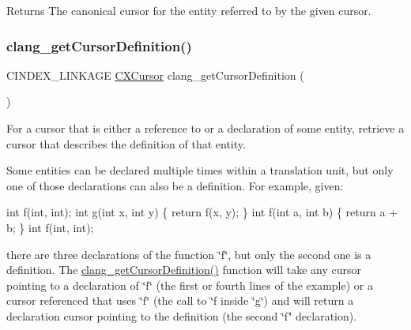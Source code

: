 \begin{DoxyReturn}{Returns}
The canonical cursor for the entity referred to by the given cursor. 
\end{DoxyReturn}
\mbox{\label{group__CINDEX__CURSOR__XREF_gafcfbec461e561bf13f1e8540bbbd655b}} 
\subsubsection{\texorpdfstring{clang\+\_\+get\+Cursor\+Definition()}{clang\_getCursorDefinition()}}
{\footnotesize\ttfamily C\+I\+N\+D\+E\+X\+\_\+\+L\+I\+N\+K\+A\+GE \hyperlink{structCXCursor}{C\+X\+Cursor} clang\+\_\+get\+Cursor\+Definition (\begin{DoxyParamCaption}\item[{\hyperlink{structCXCursor}{C\+X\+Cursor}}]{ }\end{DoxyParamCaption})}



For a cursor that is either a reference to or a declaration of some entity, retrieve a cursor that describes the definition of that entity. 

Some entities can be declared multiple times within a translation unit, but only one of those declarations can also be a definition. For example, given\+:


\begin{DoxyCode}
\textcolor{keywordtype}{int} f(\textcolor{keywordtype}{int}, \textcolor{keywordtype}{int});
\textcolor{keywordtype}{int} g(\textcolor{keywordtype}{int} x, \textcolor{keywordtype}{int} y) \{ \textcolor{keywordflow}{return} f(x, y); \}
\textcolor{keywordtype}{int} f(\textcolor{keywordtype}{int} a, \textcolor{keywordtype}{int} b) \{ \textcolor{keywordflow}{return} a + b; \}
\textcolor{keywordtype}{int} f(\textcolor{keywordtype}{int}, \textcolor{keywordtype}{int});
\end{DoxyCode}


there are three declarations of the function \char`\"{}f\char`\"{}, but only the second one is a definition. The \hyperlink{group__CINDEX__CURSOR__XREF_gafcfbec461e561bf13f1e8540bbbd655b}{clang\+\_\+get\+Cursor\+Definition()} function will take any cursor pointing to a declaration of \char`\"{}f\char`\"{} (the first or fourth lines of the example) or a cursor referenced that uses \char`\"{}f\char`\"{} (the call to \char`\"{}f\textquotesingle{} inside \char`\"{}g\char`\"{}) and will return a
declaration cursor pointing to the definition (the second \char`\"{}f" declaration).

